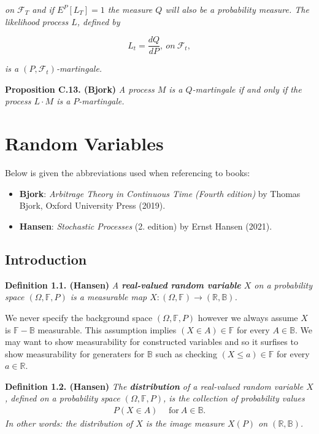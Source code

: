 \documentclass[a4paper,10pt,openany]{book}
\providecommand{\tightlist}{%
 \setlength{\itemsep}{0pt}\setlength{\parskip}{0pt}}
\begin{document}
\emph{on \(\mathcal{F}_T\) and if \(E^P[L_T]=1\) the measure \(Q\) will also be a probability measure. The likelihood process \(L\), defined by}

\[
L_t=\frac{dQ}{dP},\ on\ \mathcal{F}_t,\tag{C.8}
\]

\emph{is a \((P,\mathcal{F}_t)\)-martingale.}

\textbf{Proposition C.13. (Bjork)} \emph{A process \(M\) is a \(Q\)-martingale if and only if the process \(L\cdot M\) is a \(P\)-martingale.}

\hypertarget{random-variables-1}{%
\chapter{Random Variables}\label{random-variables-1}}

Below is given the abbreviations used when referencing to books:

\begin{itemize}
\tightlist
\item
  \textbf{Bjork}: \emph{Arbitrage Theory in Continuous Time (Fourth edition)} by Thomas Bjork, Oxford University Press (2019).\cite{bjork2009}
\item
  \textbf{Hansen}: \emph{Stochastic Processes} (2. edition) by Ernst Hansen (2021).\cite{hansen2021}
\end{itemize}

\hypertarget{introduction-1}{%
\section{Introduction}\label{introduction-1}}

\textbf{Definition 1.1. (Hansen)} \emph{A \textbf{real-valued random variable} \(X\) on a probability space \((\Omega, \mathbb{F},P)\) is a measurable map \(X : (\Omega,\mathbb{F})\to (\mathbb{R},\mathbb{B})\).}

We never specify the background space \((\Omega, \mathbb{F},P)\) however we always assume \(X\) is \(\mathbb{F}-\mathbb{B}\) measurable. This assumption implies \((X\in A)\in \mathbb{F}\) for every \(A\in \mathbb{B}\). We may want to show measurability for constructed variables and so it surfises to show measurability for generaters for \(\mathbb{B}\) such as checking \((X\le a)\in\mathbb{F}\) for every \(a\in\mathbb{R}\).

\textbf{Definition 1.2. (Hansen)} \emph{The \textbf{distribution} of a real-valued random variable \(X\), defined on a probability space \((\Omega,\mathbb{F},P)\), is the collection of probability values}
\begin{align*}
    P(X\in A)\hspace{15pt}\text{for}\ A\in \mathbb{B}.\tag{1.3}
\end{align*}
\emph{In other words: the distribution of \(X\) is the image measure \(X(P)\) on \((\mathbb{R},\mathbb{B})\).}
\end{document}
